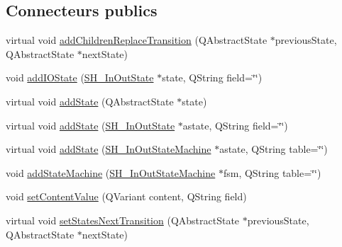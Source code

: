 \subsection*{Connecteurs publics}
\begin{DoxyCompactItemize}
\item 
virtual void \hyperlink{classSH__InOutStateMachine_ae0f3b4622d2c70884bb224dee86e95c0}{add\-Children\-Replace\-Transition} (Q\-Abstract\-State $\ast$previous\-State, Q\-Abstract\-State $\ast$next\-State)
\item 
void \hyperlink{classSH__InOutStateMachine_ab6e90f9e187ab70d51ed4e3e1f69f912}{add\-I\-O\-State} (\hyperlink{classSH__InOutState}{S\-H\-\_\-\-In\-Out\-State} $\ast$state, Q\-String field=\char`\"{}\char`\"{})
\item 
virtual void \hyperlink{classSH__InOutStateMachine_a3de9dedcdfd6efab868484c047638f71}{add\-State} (Q\-Abstract\-State $\ast$state)
\item 
virtual void \hyperlink{classSH__InOutStateMachine_a52469f4988c3eb654def2ed237fd10eb}{add\-State} (\hyperlink{classSH__InOutState}{S\-H\-\_\-\-In\-Out\-State} $\ast$astate, Q\-String field=\char`\"{}\char`\"{})
\item 
virtual void \hyperlink{classSH__InOutStateMachine_adcd6eb72b60b2c24aa6701977b5c7c1e}{add\-State} (\hyperlink{classSH__InOutStateMachine}{S\-H\-\_\-\-In\-Out\-State\-Machine} $\ast$astate, Q\-String table=\char`\"{}\char`\"{})
\item 
void \hyperlink{classSH__InOutStateMachine_a0814df2e3f2b776ba210f98cd05be70d}{add\-State\-Machine} (\hyperlink{classSH__InOutStateMachine}{S\-H\-\_\-\-In\-Out\-State\-Machine} $\ast$fsm, Q\-String table=\char`\"{}\char`\"{})
\item 
void \hyperlink{classSH__InOutStateMachine_a9ab1534306b2bdb62743d4bcefe40c17}{set\-Content\-Value} (Q\-Variant content, Q\-String field)
\item 
virtual void \hyperlink{classSH__InOutStateMachine_a70d6d81c0a8d4afd6aab0a7239edc237}{set\-States\-Next\-Transition} (Q\-Abstract\-State $\ast$previous\-State, Q\-Abstract\-State $\ast$next\-State)
\end{DoxyCompactItemize}
